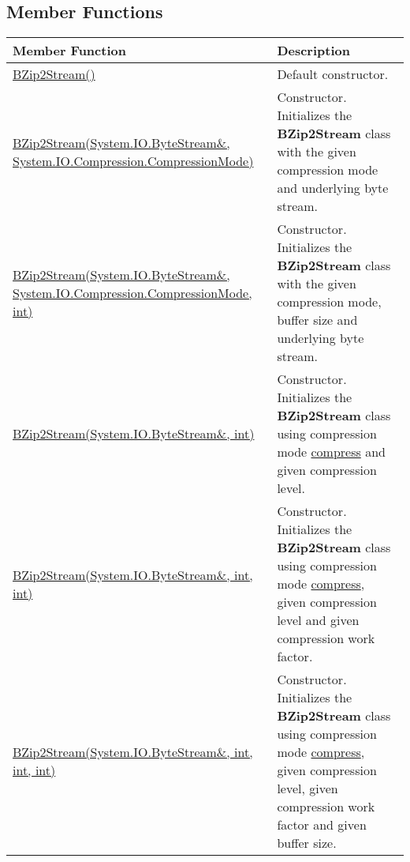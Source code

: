 \documentclass[a4paper,oneside,11.000000pt]{book}
\begin{document}
\subsection{Member Functions}
\begin{flushleft}
\begin{supertabular}[l]{!{\raggedright}p{7.575cm}!{\raggedright}p{7.575cm}}
\textbf{Member Function}
& \textbf{Description}
\\
\hline
\hyperlink{System.IO.Compression.BZip2Stream.constructor.P.System.IO.Compression.BZip2Stream}{BZip2Stream()}
& Default constructor.

\\
\hyperlink{System.IO.Compression.BZip2Stream.constructor.P.System.IO.Compression.BZip2Stream.R.System.IO.ByteStream.System.IO.Compression.CompressionMode}{BZip2Stream(System.\-IO.\-ByteStream\&\-, System.\-IO.\-Compression.\-CompressionMode)}
& Constructor. Initializes the \textbf{BZip2Stream}
 class with the given compression mode and underlying byte stream.

\\
\hyperlink{System.IO.Compression.BZip2Stream.constructor.P.System.IO.Compression.BZip2Stream.R.System.IO.ByteStream.System.IO.Compression.CompressionMode.int}{BZip2Stream(System.\-IO.\-ByteStream\&\-, System.\-IO.\-Compression.\-CompressionMode, int)}
& Constructor. Initializes the \textbf{BZip2Stream}
 class with the given compression mode, buffer size and underlying byte stream.

\\
\hyperlink{System.IO.Compression.BZip2Stream.constructor.P.System.IO.Compression.BZip2Stream.R.System.IO.ByteStream.int}{BZip2Stream(System.\-IO.\-ByteStream\&\-, int)}
& Constructor. Initializes the \textbf{BZip2Stream}
 class using compression mode \hyperlink{System.IO.Compression.CompressionMode.compress}{compress} and given compression level.

\\
\hyperlink{System.IO.Compression.BZip2Stream.constructor.P.System.IO.Compression.BZip2Stream.R.System.IO.ByteStream.int.int}{BZip2Stream(System.\-IO.\-ByteStream\&\-, int, int)}
& Constructor. Initializes the \textbf{BZip2Stream}
 class using compression mode \hyperlink{System.IO.Compression.CompressionMode.compress}{compress}, 
given compression level and given compression work factor.

\\
\hyperlink{System.IO.Compression.BZip2Stream.constructor.P.System.IO.Compression.BZip2Stream.R.System.IO.ByteStream.int.int.int}{BZip2Stream(System.\-IO.\-ByteStream\&\-, int, int, int)}
& Constructor. Initializes the \textbf{BZip2Stream}
 class using compression mode \hyperlink{System.IO.Compression.CompressionMode.compress}{compress}, 
given compression level, given compression work factor and given buffer size.


\end{supertabular}
\end{flushleft}
\end{document}
